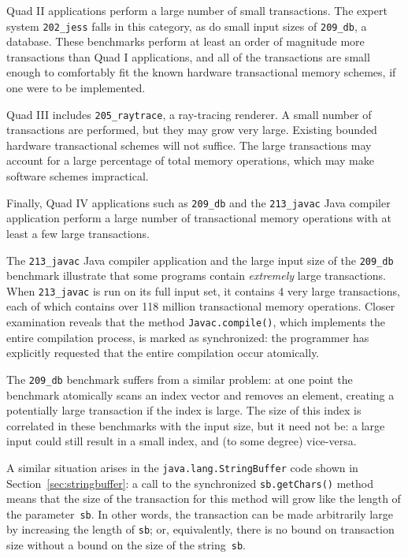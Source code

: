 \documentclass[12pt,twoside]{article}
\newcommand{\secref}[1]         {Section~\ref{sec:#1}}
\begin{document}
Quad II applications perform a large number of small transactions.
The expert system \texttt{202\_jess} falls in this category, as do
small input sizes of \texttt{209\_db}, a database.  These benchmarks
perform at least an order of magnitude more transactions than Quad
I applications, and all of the transactions are small enough to 
comfortably fit the known hardware transactional memory schemes, if
one were to be implemented.

Quad III includes \texttt{205\_raytrace}, a ray-tracing renderer.  A
small number of transactions are performed, but they may grow very
large.  Existing bounded hardware transactional schemes will not
suffice.  The large
transactions may account for a large percentage of total memory
operations, which may make software schemes impractical.

Finally, Quad IV applications such as \texttt{209\_db} and the
\texttt{213\_javac} Java compiler application perform a large number
of transactional memory operations with at least a few large transactions.  

The \texttt{213\_javac} Java compiler application and the large input
size of the \texttt{209\_db} benchmark illustrate that some programs
contain \emph{extremely} large transactions.  When \texttt{213\_javac}
is run on its full input set, it contains 4 very large transactions,
each of which contains over 118 million transactional memory
operations.  Closer
examination reveals that the method \texttt{Javac.compile()}, which
implements the entire compilation process, is marked as synchronized:
the programmer has explicitly requested that the entire compilation
occur atomically.

The \texttt{209\_db} benchmark suffers from a similar problem: at one
point the benchmark atomically scans an index vector and removes an
element, creating a potentially large transaction if the index is
large.  The size of this index is correlated in these benchmarks with
the input size, but it need not be: a large input could still result
in a small index, and (to some degree) vice-versa.

A similar situation arises in the {\tt java.lang.StringBuffer} code
shown in \secref{stringbuffer}:  a call to the synchronized
\texttt{sb.getChars()} method means that
the size of the transaction for this method will grow like the length
of the parameter~\texttt{sb}.  In other words, the transaction can be
made arbitrarily large by increasing the length of \texttt{sb}; or,
equivalently, there is no bound on transaction size without a bound on
the size of the string~\texttt{sb}.
\end{document}
